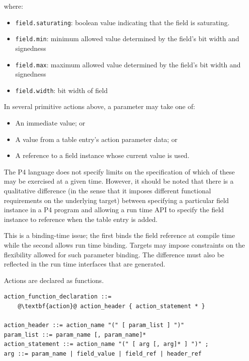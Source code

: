 \documentclass[12pt]{article}
\begin{document}
where:

\begin{itemize}
\item
\texttt{field.saturating}: boolean value indicating that the field is saturating.
\item
\texttt{field.min}: minimum allowed value determined by the field's bit width and 
signedness
\item
\texttt{field.max}: maximum allowed value determined by the field's bit width and 
signedness
\item
\texttt{field.width}: bit width of field
\end{itemize}


In several primitive actions above, a parameter may take one of:

\begin{itemize}
\item
An immediate value; or
\item
A value from a table entry's action parameter data; or
\item
A reference to a field instance whose current value is used.
\end{itemize}


The P4 language does not specify limits on the specification of which of these 
may be exercised at a given time. However, it should be noted that there is 
a qualitative difference (in the sense that it imposes different functional 
requirements on the underlying target) between specifying a particular field 
instance in a P4 program and allowing a run time API to specify the field 
instance to reference when the table entry is added. 

This is a binding-time issue; the first binds the field reference at compile 
time while the second allows run time binding. Targets may impose constraints 
on the flexibility allowed for such parameter binding. The difference must 
also be reflected in the run time interfaces that are generated.


Actions are declared as functions.

\begin{lstlisting}[frame=single,backgroundcolor=\color{bnfgreen},escapechar=\@]
action_function_declaration ::=
    @\textbf{action}@ action_header { action_statement * }

action_header ::= action_name "(" [ param_list ] ")"
param_list ::= param_name [, param_name]*
action_statement ::= action_name "(" [ arg [, arg]* ] ")" ;
arg ::= param_name | field_value | field_ref | header_ref
\end{lstlisting}
\end{document}

